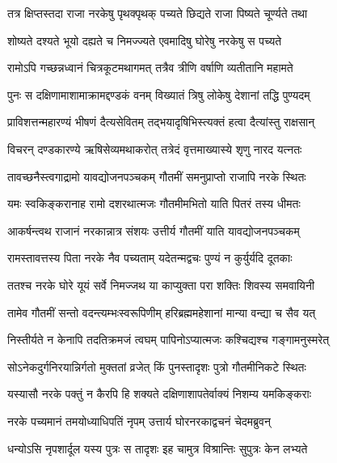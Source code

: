 \twolineshloka
{तत्र क्षिप्तस्तदा राजा नरकेषु पृथक्पृथक्}
{पच्यते छिद्यते राजा पिष्यते चूर्ण्यते तथा} %

\twolineshloka
{शोष्यते दश्यते भूयो दह्यते च निमज्ज्यते}
{एवमादिषु घोरेषु नरकेषु स पच्यते} %

\twolineshloka
{रामोऽपि गच्छन्नध्वानं चित्रकूटमथागमत्}
{तत्रैव त्रीणि वर्षाणि व्यतीतानि महामते} %

\twolineshloka
{पुनः स दक्षिणामाशामाक्रामद्दण्डकं वनम्}
{विख्यातं त्रिषु लोकेषु देशानां तद्धि पुण्यदम्} %

\twolineshloka
{प्राविशत्तन्महारण्यं भीषणं दैत्यसेवितम्}
{तद्भयादृषिभिस्त्यक्तं हत्वा दैत्यांस्तु राक्षसान्} %

\twolineshloka
{विचरन् दण्डकारण्ये ऋषिसेव्यमथाकरोत्}
{तत्रेदं वृत्तमाख्यास्ये शृणु नारद यत्नतः} %

\twolineshloka
{तावच्छनैस्त्वगाद्रामो यावद्योजनपञ्चकम्}
{गौतमीं समनुप्राप्तो राजापि नरके स्थितः} %

\twolineshloka
{यमः स्वकिङ्करानाह रामो दशरथात्मजः}
{गौतमीमभितो याति पितरं तस्य धीमतः} %

\twolineshloka
{आकर्षन्त्वथ राजानं नरकान्नात्र संशयः}
{उत्तीर्य गौतमीं याति यावद्योजनपञ्चकम्} %

\twolineshloka
{रामस्तावत्तस्य पिता नरके नैव पच्यताम्}
{यदेतन्मद्वचः पुण्यं न कुर्युर्यदि दूतकाः} %

\twolineshloka
{ततश्च नरके घोरे यूयं सर्वे निमज्जथ}
{या काप्युक्ता परा शक्तिः शिवस्य समवायिनी} %

\twolineshloka
{तामेव गौतमीं सन्तो वदन्त्यम्भःस्वरूपिणीम्}
{हरिब्रह्ममहेशानां मान्या वन्द्या च सैव यत्} %

\twolineshloka
{निस्तीर्यते न केनापि तदतिक्रमजं त्वघम्}
{पापिनोऽप्यात्मजः कश्चिद्यश्च गङ्गामनुस्मरेत्} %

\twolineshloka
{सोऽनेकदुर्गनिरयान्निर्गतो मुक्ततां व्रजेत्}
{किं पुनस्तादृशः पुत्रो गौतमीनिकटे स्थितः} %

\twolineshloka
{यस्यासौ नरके पक्तुं न कैरपि हि शक्यते}
{दक्षिणाशापतेर्वाक्यं निशम्य यमकिङ्कराः} %

\twolineshloka
{नरके पच्यमानं तमयोध्याधिपतिं नृपम्}
{उत्तार्य घोरनरकाद्वचनं चेदमब्रुवन्} %



\twolineshloka
{धन्योऽसि नृपशार्दूल यस्य पुत्रः स तादृशः}
{इह चामुत्र विश्रान्तिः सुपुत्रः केन लभ्यते} %



